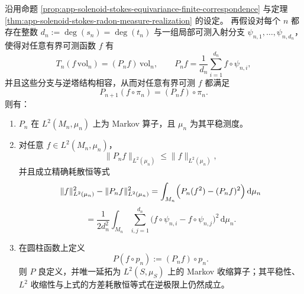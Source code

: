 \begin{proposition}\label{prop:app-solenoid-stokes-markov-variance-dissipation}
沿用命题 \ref{prop:app-solenoid-stokes-equivariance-finite-correspondence} 与定理 \ref{thm:app-solenoid-stokes-radon-measure-realization} 的设定。
再假设对每个 \(n\) 都存在整数
\(
d_n:=\deg(s_n)=\deg(t_n)
\)
与一组局部可测入射分支 \(\psi_{n,1},\dots,\psi_{n,d_n}\)，使得对任意有界可测函数 \(f\) 有
\[
T_n(f\,\mathrm{vol}_n)=(P_n f)\,\mathrm{vol}_n,
\qquad
P_n f=\frac1{d_n}\sum_{i=1}^{d_n}f\circ\psi_{n,i},
\]
并且这些分支与逆塔结构相容，从而对任意有界可测 \(f\) 都满足
\[
P_{n+1}(f\circ\pi_n)=(P_n f)\circ\pi_n.
\]
则有：
\begin{enumerate}
  \item \(P_n\) 在 \(L^2(M_n,\mu_n)\) 上为 Markov 算子，且 \(\mu_n\) 为其平稳测度。
  \item 对任意 \(f\in L^2(M_n,\mu_n)\)，
  \[
  \|P_nf\|_{L^2(\mu_n)}\le \|f\|_{L^2(\mu_n)},
  \]
  并且成立精确耗散恒等式
  \[
  \|f\|_{L^2(\mu_n)}^2-\|P_nf\|_{L^2(\mu_n)}^2
  =
  \int_{M_n}\Bigl(P_n(f^2)-(P_nf)^2\Bigr)\,\mathrm d\mu_n
  \]
  \[
  =
  \frac1{2d_n^2}\int_{M_n}\sum_{i,j=1}^{d_n}
  \bigl(f\circ\psi_{n,i}-f\circ\psi_{n,j}\bigr)^2\,\mathrm d\mu_n.
  \]
  \item 在圆柱函数上定义
  \[
  P(f\circ p_n):=(P_n f)\circ p_n.
  \]
  则 \(P\) 良定义，并唯一延拓为 \(L^2(S,\mu_S)\) 上的 Markov 收缩算子；其平稳性、\(L^2\) 收缩性与上式的方差耗散恒等式在逆极限上仍然成立。
\end{enumerate}
\end{proposition}

